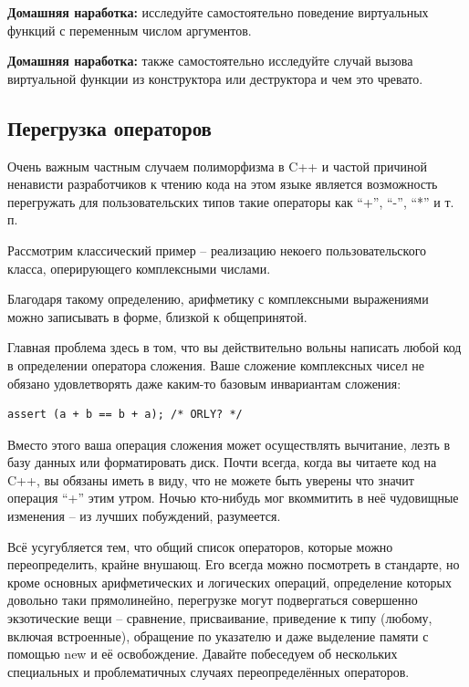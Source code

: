 \documentclass[a4paper,12pt,oneside]{article}
\begin{document}
\textbf{Домашняя наработка:} исследуйте самостоятельно поведение виртуальных функций с переменным числом аргументов.

\textbf{Домашняя наработка:} также самостоятельно исследуйте случай вызова виртуальной функции из конструктора или деструктора и чем это чревато.

\subsection{Перегрузка операторов}\label{OperatorOverloading}

Очень важным частным случаем полиморфизма в C++ и частой причиной ненависти разработчиков к чтению кода на этом языке является возможность перегружать для пользовательских типов такие операторы как ``+'', ``-'', ``*'' и т. п.

Рассмотрим классический пример – реализацию некоего пользовательского класса, оперирующего комплексными числами.



Благодаря такому определению, арифметику с комплексными выражениями можно записывать в форме, близкой к общепринятой.



Главная проблема здесь в том, что вы действительно вольны написать любой код в определении оператора сложения. Ваше сложение комплексных чисел не обязано удовлетворять даже каким-то базовым инвариантам сложения:

\begin{lstlisting}
assert (a + b == b + a); /* ORLY? */
\end{lstlisting}

Вместо этого ваша операция сложения может осуществлять вычитание, лезть в базу данных или форматировать диск. Почти всегда, когда вы читаете код на C++, вы обязаны иметь в виду, что не можете быть уверены что значит операция ``+'' этим утром. Ночью кто-нибудь мог вкоммитить в неё чудовищные изменения – из лучших побуждений, разумеется.

Всё усугубляется тем, что общий список операторов, которые можно переопределить, крайне внушающ. Его всегда можно посмотреть в стандарте, но кроме основных арифметических и логических операций, определение которых довольно таки прямолинейно, перегрузке могут подвергаться совершенно экзотические вещи – сравнение, присваивание, приведение к типу (любому, включая встроенные), обращение по указателю и даже выделение памяти с помощью new и её освобождение. Давайте побеседуем об нескольких специальных и проблематичных случаях переопределённых операторов.
\end{document}
